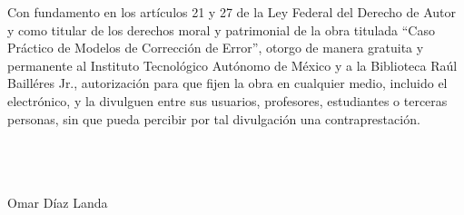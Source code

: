 \thispagestyle{empty}
\noindent Con fundamento en los artí­culos 21 y 27 de la Ley Federal del Derecho de Autor y como titular de los derechos moral y patrimonial de la obra titulada ``Caso Práctico de Modelos de Corrección de Error'', otorgo de manera gratuita y permanente al Instituto Tecnológico Autónomo de México y a la Biblioteca Raúl Bailléres Jr., autorización para que fijen la obra en cualquier medio, incluido el electrónico, y la divulguen entre sus usuarios, profesores, estudiantes o terceras personas, sin que pueda percibir por tal divulgación una contraprestación.\\\\\\\\

\begin{center} 
Omar Díaz Landa\\
\par\noindent\makebox[2.5in]{ }\\
\vspace{10mm}
\par\noindent\makebox[2.5in]{\hrulefill}\\
\par\noindent{}\\
\par\noindent\makebox[2.5in]{ }\\
\vspace{10mm}
\par\noindent\makebox[2.5in]{\hrulefill}\\
\par\noindent{}\\
\end{center}
\clearpage %
